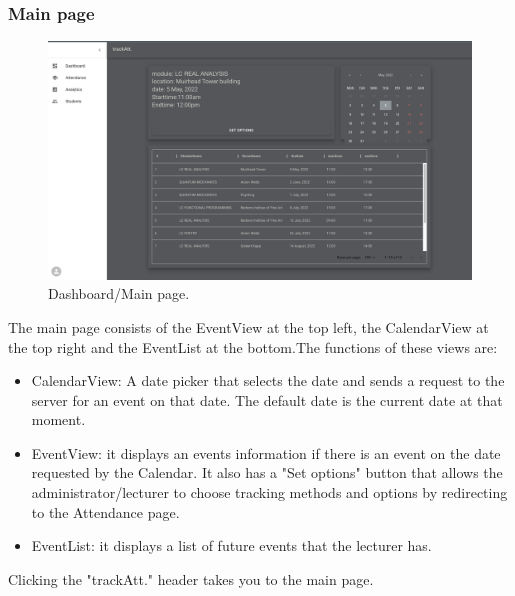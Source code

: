 \subsubsection{Main page}
\begin{figure}[ht!]
  \includegraphics[scale=0.135]{Design & Implementation/images/Dashboard.png}
  \caption{Dashboard/Main page.}
\end{figure}
The main page consists of the EventView at the top left, the CalendarView at the top right and the EventList at the bottom.The functions of these views are:
\begin{itemize}
  \item CalendarView: A date picker that selects the date and sends a request to the server for an event on that date. The default date is the current date at that moment.
  \item EventView: it displays an events information if there is an event on the date requested by the Calendar. It also has a "Set options" button that allows the administrator/lecturer to choose tracking methods and options by redirecting to the Attendance page. 
  \item EventList: it displays a list of future events that the lecturer has.
\end{itemize}
Clicking the "trackAtt." header takes you to the main page.

